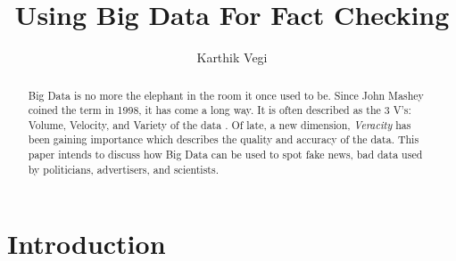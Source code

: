 \documentclass[sigconf]{acmart}
\begin{document}
\title{Using Big Data For Fact Checking}

\author{Karthik Vegi}


\renewcommand{\shortauthors}{kvegi}


\begin{abstract}
Big Data is no more the elephant in the room it once used to be. Since John Mashey coined the term in 1998, it has come a long way. It is often described as the 3 V's: Volume, Velocity, and Variety of the data \cite{www-sas}. Of late, a new dimension, \textit{Veracity} has been gaining importance which describes the quality and accuracy of the data. This paper intends to discuss how Big Data can be used to spot fake news, bad data used by politicians, advertisers, and scientists.
\end{abstract}


\maketitle

\section{Introduction}
\end{document}
